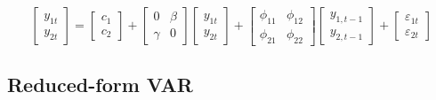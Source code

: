 \documentclass[notitlepage]{article}
\begin{document}
\begin{itemize}
    \[
    \begin{bmatrix} y_{1t} \\ y_{2t} \end{bmatrix} =
    \begin{bmatrix} c_1 \\ c_2 \end{bmatrix} +
    \begin{bmatrix} 0 & \beta \\ \gamma & 0 \end{bmatrix}
    \begin{bmatrix} y_{1t} \\ y_{2t} \end{bmatrix} +
    \begin{bmatrix} \phi_{11} & \phi_{12} \\ \phi_{21} & \phi_{22} \end{bmatrix}
    \begin{bmatrix} y_{1,t-1} \\ y_{2,t-1} \end{bmatrix} +
    \begin{bmatrix} \varepsilon_{1t} \\ \varepsilon_{2t} \end{bmatrix}
    \]
\end{itemize}

\subsection{Reduced-form VAR}
\end{document}
